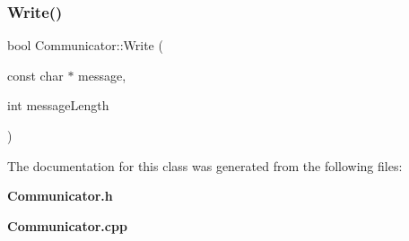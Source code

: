\subsubsection{Write()}
{\footnotesize\ttfamily bool Communicator\+::\+Write (\begin{DoxyParamCaption}\item[{const char $\ast$}]{message,  }\item[{int}]{message\+Length }\end{DoxyParamCaption})}



The documentation for this class was generated from the following files\+:\begin{DoxyCompactItemize}
\item 
\textbf{ Communicator.\+h}\item 
\textbf{ Communicator.\+cpp}\end{DoxyCompactItemize}
